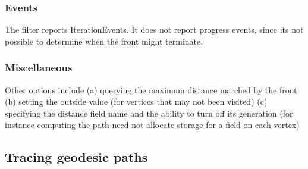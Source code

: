\documentclass{InsightArticle}
\begin{document}
\subsubsection{Events}
The filter reports IterationEvents. It does not report progress events,
since its not possible to determine when the front might terminate.

\subsubsection{Miscellaneous}
Other options include (a) querying the maximum distance marched by the front 
(b) setting the outside value (for vertices that may not been visited) (c) specifying the distance field name and the ability to turn off its generation (for instance computing the path need not allocate storage for a field on each vertex)


\subsection{Tracing geodesic paths}
\end{document}
